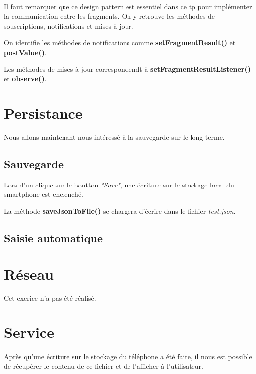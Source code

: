 \documentclass[a4paper]{article}
\begin{document}
\begin{multicols}{2}
                \paragraph{}
                    Il faut remarquer que ce design pattern est essentiel dans ce tp pour implémenter la communication entre les fragments. On y retrouve les méthodes de souscriptions, notifications et mises à jour.

                    On identifie les méthodes de notifications comme \textbf{setFragmentResult()} et \textbf{postValue()}.

                    Les méthodes de mises à jour correspondendt à \textbf{setFragmentResultListener()} et \textbf{observe()}.
        \section{Persistance}
            \paragraph{}
                Nous allons maintenant nous intéressé à la sauvegarde sur le long terme.
            \subsection{Sauvegarde}
                Lors d'un clique sur le boutton \emph{"Save"}, une écriture sur le stockage local du smartphone est enclenché.

                La méthode \textbf{saveJsonToFile()} se chargera d'écrire dans le fichier \emph{test.json}. 
            \subsection{Saisie automatique}
        \section{Réseau}
            Cet exerice n'a pas été réalisé.
        \section{Service}
            \paragraph{}
                Après qu'une écriture sur le stockage du téléphone a été faite, il nous est possible de récupérer le contenu de ce fichier et de l'afficher à l'utilisateur.


\end{multicols}
\end{document}
